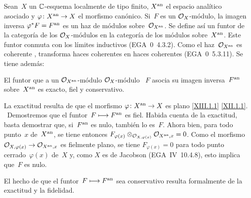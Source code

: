\subsection{}
\label{XII.1.3}
Sean~$X$ un $\CC$-esquema localmente de tipo finito, $X^\an$ el espacio
analítico asociado y $\varphi\colon X^\an\to X$ el morfismo canónico. Si~$F$
es un $\cal{O}_X$-módulo, la imagen inversa
$\varphi^*F=F^\an$ es un haz de módulos sobre~$\cal{O}_{X^\an}$. Se define
así un funtor de la categoría de los $\cal{O}_X$-módulos en la categoría de
los módulos sobre~$X^\an$. Este funtor conmuta con los límites inductivos
(EGA~0~4.3.2). Como el haz~$\cal{O}_{X^\an}$ es coherente
\cite[~\S 2~th]{XII.4}, transforma haces coherentes en haces
coherentes (EGA~0~5.3.11). Se tiene además:

\begingroup
\setcounter{proposition}{0}%
\renewcommand{\theproposition}{\thesubsection.\arabic{proposition}}
\renewcommand{\theHproposition}{\theHsubsection.\arabic{proposition}}
\begin{subproposition}
\label{XII.1.3.1}
El funtor que a un
{$\cal{O}_{X^\an}$-módulo}
{$\cal{O}_X$-módulo}%
~$F$ asocia su imagen inversa~$F^\an$ sobre~$X^\an$ es exacto, fiel y
conservativo.
\end{subproposition}
\endgroup

La exactitud resulta de que el morfismo $\varphi\colon X^\an\to X$ es plano
{\eqref{XIII.1.1}}
{\eqref{XII.1.1}}.%
\ Demostremos que el funtor~$F\mto F^\an$ es fiel. Habida cuenta de la
exactitud, basta demostrar que, si~$F^\an$ es nulo, también lo es~$F$. Ahora
bien, para todo punto~$x$ de~$X^\an$, se tiene entonces
$F_{\varphi(x)}\otimes_{\cal{O}_{X,\varphi(x)}}\cal{O}_{X^\an,x}=0$. Como el
morfismo $\cal{O}_{X,\varphi(x)}\to\cal{O}_{X^\an,x}$ es fielmente plano, se
tiene $F_{\varphi(x)}=0$ para todo punto cerrado~$\varphi(x)$ de~$X$ y, como
$X$ es de Jacobson (EGA~IV~10.4.8), esto implica que~$F$ es nulo.

El
hecho de que el funtor~$F\mto F^\an$ sea conservativo resulta formalmente de
la exactitud y la fidelidad.
